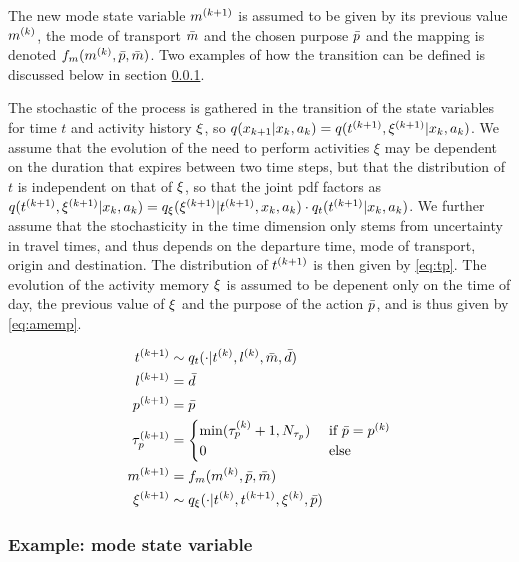 The new mode state variable $m^{(k+1)}$ is assumed to be given by its previous value $m^{(k)}$, the mode of transport $\bar{m}$ and the chosen purpose $\bar{p}$ and the mapping is denoted $f_m(m^{(k)},\bar{p},\bar{m})$. Two examples of how the transition can be defined is discussed below in section \ref{sec:modestate}.

The stochastic of the process is gathered in the transition of the state variables for time $t$ and activity history $\xi$, so $q(x_{k+1}|x_k,a_k) = q(t^{(k+1)},\xi^{(k+1)}| x_k,a_k)$. We assume that the evolution of the need to perform activities $\xi$ may be dependent on the duration that expires between two time steps, but that the distribution of $t$ is independent on that of $\xi$, so that the joint pdf factors as $q(t^{(k+1)},\xi^{(k+1)}| x_k,a_k) = q_\xi(\xi^{(k+1)} |t^{(k+1)},x_k,a_k)\cdot q_t (t^{(k+1)} |x_k,a_k)$. We further assume that the stochasticity in the time dimension only stems from uncertainty in travel times, and thus depends on the departure time, mode of transport, origin and destination. The distribution of $t^{(k+1)}$ is then given by \eqref{eq:tp}. The evolution of the activity memory $\xi$ is assumed to be depenent only on the time of day, the previous value of $\xi$ and the purpose of the action $\bar{p}$, and is thus given by \eqref{eq:amemp}. 



\begin{subequations}
\begin{align}
t\ks{k+1} & \sim q_t (\cdot | t\ks{k},l\ks{k},\act{m},\act{d}) \label{eq:tp}\\
l\ks{k+1} &= \act{d} \\
p\ks{k+1} &= \act{p} \\
\atime_p\ks{k+1} & = \begin{cases}
                \min(\atime_p\ks{k} + 1,N_{\atime_p}) & \cif \act{p} = p\ks{k} \\
                0 & \celse 
    \end{cases} \label{eq:tauP} \\
    m\ks{k+1} &= f_m(m\ks{k},\act{p},\act{m}) \\
\amem\ks{k+1} & \sim q_\amem(\cdot | t\ks{k}, t\ks{k+1},\amem\ks{k},\act{p}) \label{eq:amemp}
\end{align}
\end{subequations}


\subsubsection{Example: mode state variable}
\label{sec:modestate}
